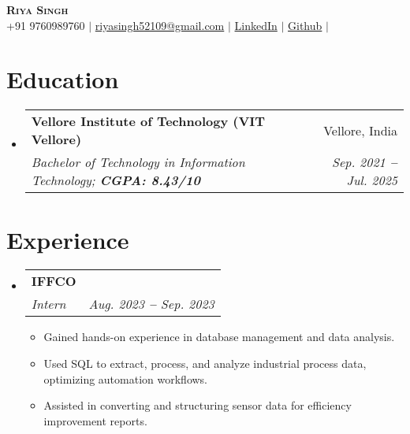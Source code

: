 \documentclass[letterpaper,11pt]{article}
\makeatletter
\newcommand{\resumeItem}[1]{
  \item\small{
    {#1 \vspace{-2pt}}
  }
}
\newcommand{\resumeSubheading}[4]{
  \vspace{-2pt}\item
    \begin{tabular*}{0.97\textwidth}[t]{l@{\extracolsep{\fill}}r}
      \textbf{#1} & #2 \\
      \textit{\small#3} & \textit{\small #4} \\
    \end{tabular*}\vspace{-7pt}
}
\newcommand{\resumeSubHeadingListStart}{\begin{itemize}[leftmargin=0.15in, label={}]}
\newcommand{\resumeSubHeadingListEnd}{\end{itemize}}
\newcommand{\resumeItemListStart}{\begin{itemize}}
\newcommand{\resumeItemListEnd}{\end{itemize}\vspace{-5pt}}
\makeatother
\begin{document}

\begin{center}
    \textbf{\Huge \scshape Riya Singh} \\ \vspace{3pt}
    \small
    \faMobile \hspace{.5pt} {+91 9760989760}
    $|$
    \faAt \hspace{.5pt} \href{mailto:riyasingh52109@gmail.com}{riyasingh52109@gmail.com}
    $|$
    \faLinkedinSquare \hspace{.5pt} \href{https://www.linkedin.com/in/riya-singh-b27b48228}{LinkedIn}
    $|$
    \faGithub \hspace{.5pt} \href{https://github.com/RIYA-Singh21}{Github}
    $|$
    
\end{center}




\section{Education}
  \vspace{3pt}
  \resumeSubHeadingListStart

  
\resumeSubheading
{Vellore Institute of Technology (VIT Vellore)
}{Vellore, India}
{Bachelor of Technology in Information Technology;   \textbf{CGPA: 8.43/10}}{Sep. 2021 \textbf{--} Jul. 2025}


  \resumeSubHeadingListEnd



\section{Experience}
  \vspace{3pt}
  \resumeSubHeadingListStart

  
\resumeSubheading
      {IFFCO}{}
      {Intern}{Aug. 2023 \textbf{--} Sep. 2023}
      \resumeItemListStart
      \resumeItem{Gained hands-on experience in database management and data analysis.}\resumeItem{Used SQL to extract, process, and analyze industrial process data, optimizing automation workflows.}\resumeItem{Assisted in converting and structuring sensor data for efficiency improvement reports.}
        \resumeItemListEnd


  \resumeSubHeadingListEnd
\end{document}
